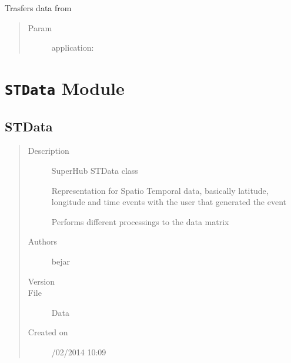 \documentclass[letterpaper,10pt,english]{sphinxmanual}
\begin{document}

\begin{fulllineitems}
\label{index:SuperHub.DB.transferApplicationData}
Trasfers data from
\begin{quote}\begin{description}
\item[{Param }] \leavevmode
application:

\end{description}\end{quote}

\end{fulllineitems}



\chapter{\texttt{STData} Module}
\label{index:stdata-module}\label{index:module-SuperHub.STData}\label{index:module-Data}

\section{STData}
\label{index:stdata}\begin{quote}\begin{description}
\item[{Description}] \leavevmode
SuperHub STData class

Representation for Spatio Temporal data, basically latitude, longitude and time events with the user that
generated the event

Performs different processings to the data matrix

\item[{Authors}] \leavevmode
bejar

\item[{Version}] 

\item[{File}] \leavevmode
Data

\item[{Created on}] /02/2014 10:09

\end{description}\end{quote}
\end{document}

